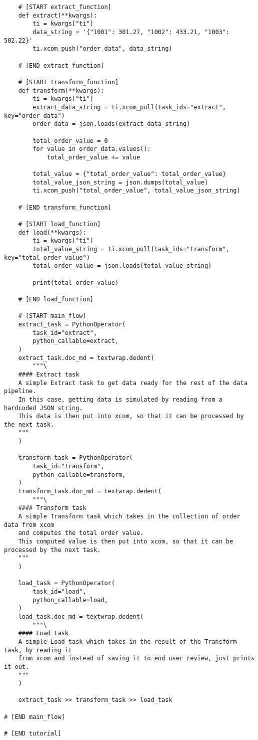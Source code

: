 \documentclass[a4paper,12pt]{report}
\begin{document}
\begin{verbatim}
    # [START extract_function]
    def extract(**kwargs):
        ti = kwargs["ti"]
        data_string = '{"1001": 301.27, "1002": 433.21, "1003": 502.22}'
        ti.xcom_push("order_data", data_string)

    # [END extract_function]

    # [START transform_function]
    def transform(**kwargs):
        ti = kwargs["ti"]
        extract_data_string = ti.xcom_pull(task_ids="extract", key="order_data")
        order_data = json.loads(extract_data_string)

        total_order_value = 0
        for value in order_data.values():
            total_order_value += value

        total_value = {"total_order_value": total_order_value}
        total_value_json_string = json.dumps(total_value)
        ti.xcom_push("total_order_value", total_value_json_string)

    # [END transform_function]

    # [START load_function]
    def load(**kwargs):
        ti = kwargs["ti"]
        total_value_string = ti.xcom_pull(task_ids="transform", key="total_order_value")
        total_order_value = json.loads(total_value_string)

        print(total_order_value)

    # [END load_function]

    # [START main_flow]
    extract_task = PythonOperator(
        task_id="extract",
        python_callable=extract,
    )
    extract_task.doc_md = textwrap.dedent(
        """\
    #### Extract task
    A simple Extract task to get data ready for the rest of the data pipeline.
    In this case, getting data is simulated by reading from a hardcoded JSON string.
    This data is then put into xcom, so that it can be processed by the next task.
    """
    )

    transform_task = PythonOperator(
        task_id="transform",
        python_callable=transform,
    )
    transform_task.doc_md = textwrap.dedent(
        """\
    #### Transform task
    A simple Transform task which takes in the collection of order data from xcom
    and computes the total order value.
    This computed value is then put into xcom, so that it can be processed by the next task.
    """
    )

    load_task = PythonOperator(
        task_id="load",
        python_callable=load,
    )
    load_task.doc_md = textwrap.dedent(
        """\
    #### Load task
    A simple Load task which takes in the result of the Transform task, by reading it
    from xcom and instead of saving it to end user review, just prints it out.
    """
    )

    extract_task >> transform_task >> load_task

# [END main_flow]

# [END tutorial]

\end{verbatim}
\end{document}
